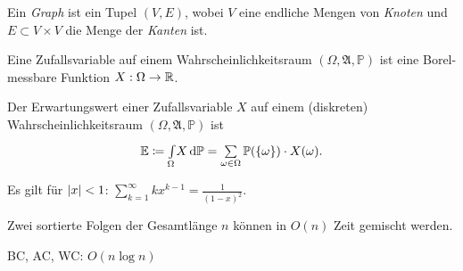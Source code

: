 \documentclass{cheat-sheet}
\newcommand{\Alg}{\mathfrak{A}} %
\renewcommand{\P}{\mathbb{P}} %
\newcommand{\E}{\mathbb{E}} %
\begin{document}

\begin{defn}
  Ein \emph{Graph} ist ein Tupel $(V, E)$, wobei $V$ eine endliche Mengen von \emph{Knoten} und $E \subset V \times V$ die Menge der \emph{Kanten} ist.
\end{defn}




\begin{defn}
  Eine Zufallsvariable auf einem Wahrscheinlichkeitsraum $(\Omega, \Alg, \P)$ ist eine Borel-messbare Funktion $X : \Omega \to \mathbb{R}$.
\end{defn}

\begin{defn}
  Der Erwartungswert einer Zufallsvariable $X$ auf einem (diskreten) Wahrscheinlichkeitsraum $(\Omega, \Alg, \P)$ ist
  \[ \E \coloneqq \Int{\Omega}{}{X}{\P} = \sum_{\omega \in \Omega} \P(\{ \omega \}) \cdot X(\omega). \]
\end{defn}


\begin{bem}
  Es gilt für $\lvert x\rvert < 1$: $\sum_{k=1}^\infty k x^{k{-}1} = \tfrac{1}{(1-x)^2}$.
\end{bem}





\begin{alg}
  Zwei sortierte Folgen der Gesamtlänge $n$ können in $O(n)$ Zeit gemischt werden.
\end{alg}

\begin{alg}[Mergesort]
  BC, AC, WC: $O(n \log n)$
\end{alg}

\end{document}
